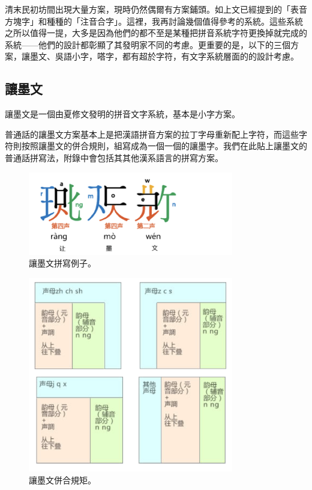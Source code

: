 \documentclass[a5paper, 12pt, openany]{book} %
\begin{document}
清末民初坊間出現大量方案，現時仍然偶爾有方案鋪頭。如上文已經提到的「表音方塊字」和種種的「注音合字」。這裡，我再討論幾個值得參考的系統。這些系統之所以值得一提，大多是因為他們的都不至是某種把拼音系統字符更換掉就完成的系統——他們的設計都彰顯了其發明家不同的考慮。更重要的是，以下的三個方案，讓墨文、吳語小字，嗒字，都有超於字符，有文字系統層面的的設計考慮。

\subsection{讓墨文}

讓墨文是一個由夏修文發明的拼音文字系統，基本是小字方案。 

普通話的讓墨文方案基本上是把漢語拼音方案的拉丁字母重新配上字符，而這些字符則按照讓墨文的併合規則，組寫成為一個一個的讓墨字。我們在此貼上讓墨文的普通話拼寫法，附錄中會包括其其他漢系語言的拼寫方案。


\begin{figure}[h!]
  \centering
  \includegraphics[width=0.8\textwidth]{./images/rangmowen_1.png}
  \caption{讓墨文拼寫例子。}
  \label{fig:rangmowen_1}
\end{figure}


\begin{figure}[H]
  \centering
  \includegraphics[width=0.8\textwidth]{./images/rangmowen_2.png}
  \caption{讓墨文併合規矩。}
  \label{fig:rangmowen_2}
\end{figure}
\end{document}
